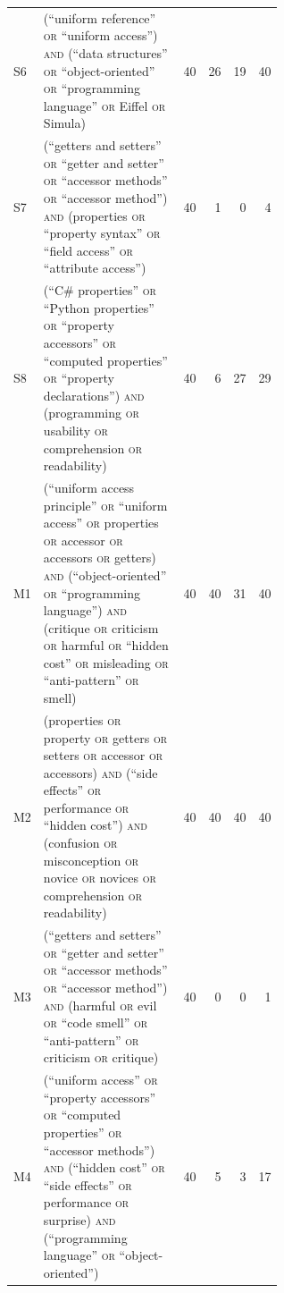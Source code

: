 \begin{table}[!b]
\begin{tabular}{@{}lp{0.6\linewidth}rrrr@{}}
      S6 & (\enquote{uniform reference} \textsc{or} \enquote{uniform access}) \textsc{and} (\enquote{data structures} \textsc{or} \enquote{object-oriented} \textsc{or} \enquote{programming language} \textsc{or} Eiffel \textsc{or} Simula)
         & 40 & 26 & 19 & 40 \\
      S7 & (\enquote{getters and setters} \textsc{or} \enquote{getter and setter} \textsc{or} \enquote{accessor methods} \textsc{or} \enquote{accessor method}) \textsc{and} (properties \textsc{or} \enquote{property syntax} \textsc{or} \enquote{field access} \textsc{or} \enquote{attribute access})
         & 40 & 1 & 0 & 4 \\
      S8 & (\enquote{C\# properties} \textsc{or} \enquote{Python properties} \textsc{or} \enquote{property accessors} \textsc{or} \enquote{computed properties} \textsc{or} \enquote{property declarations}) \textsc{and} (programming \textsc{or} usability \textsc{or} comprehension \textsc{or} readability)
         & 40 & 6 & 27 & 29 \\
      \midrule
      M1 & (\enquote{uniform access principle} \textsc{or} \enquote{uniform access} \textsc{or} properties \textsc{or} accessor \textsc{or} accessors \textsc{or} getters) \textsc{and} (\enquote{object-oriented} \textsc{or} \enquote{programming language}) \textsc{and} (critique \textsc{or} criticism \textsc{or} harmful \textsc{or} \enquote{hidden cost} \textsc{or} misleading \textsc{or} \enquote{anti-pattern} \textsc{or} smell)
         & 40 & 40 & 31 & 40 \\
      M2 & (properties \textsc{or} property \textsc{or} getters \textsc{or} setters \textsc{or} accessor \textsc{or} accessors) \textsc{and} (\enquote{side effects} \textsc{or} performance \textsc{or} \enquote{hidden cost}) \textsc{and} (confusion \textsc{or} misconception \textsc{or} novice \textsc{or} novices \textsc{or} comprehension \textsc{or} readability)
         & 40 & 40 & 40 & 40 \\
      M3 & (\enquote{getters and setters} \textsc{or} \enquote{getter and setter} \textsc{or} \enquote{accessor methods} \textsc{or} \enquote{accessor method}) \textsc{and} (harmful \textsc{or} evil \textsc{or} \enquote{code smell} \textsc{or} \enquote{anti-pattern} \textsc{or} criticism \textsc{or} critique)
         & 40 & 0 & 0 & 1 \\
      M4 & (\enquote{uniform access} \textsc{or} \enquote{property accessors} \textsc{or} \enquote{computed properties} \textsc{or} \enquote{accessor methods}) \textsc{and} (\enquote{hidden cost} \textsc{or} \enquote{side effects} \textsc{or} performance \textsc{or} surprise) \textsc{and} (\enquote{programming language} \textsc{or} \enquote{object-oriented})
         & 40 & 5 & 3 & 17 \\
      \bottomrule
    \end{tabular}
\end{table}

